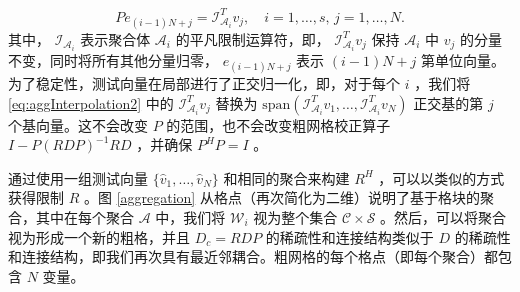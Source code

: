 \documentclass{siamltex}
\begin{document}
\begin{equation} \label{eq:aggInterpolation2}
  Pe_{(i-1)N+j} = \mathcal{I}^T_{\mathcal{A}_i}v_j, \quad i=1,\ldots,s, \, j=1,\ldots,N.
\end{equation}    其中，   $\mathcal{I}_{\mathcal{A}_i}$    表示聚合体    $\mathcal{A}_i$    的平凡限制运算符，即，   $\mathcal{I}^T_{\mathcal{A}_i}v_j$    保持    $\mathcal{A}_{i}$    中    $v_j$    的分量不变，同时将所有其他分量归零，   $e_{(i-1)N+j}$    表示    $(i-1)N+j$    第单位向量。为了稳定性，测试向量在局部进行了正交归一化，即，对于每个    $i$    ，我们将    \eqref{eq:aggInterpolation2}    中的    $\mathcal{I}_{\mathcal{A}_i}^Tv_j$    替换为    $\mbox{span}(\mathcal{I}^T_{\mathcal{A}_i}v_1,\ldots,\mathcal{I}^T_{\mathcal{A}_i}v_N)$    正交基的第    $j$    个基向量。这不会改变    $P$    的范围，也不会改变粗网格校正算子    $I-P(RDP)^{-1}RD$    ，并确保    $P^HP = I$    。

通过使用一组测试向量    $ \{  \hat{v}_1,\ldots, \hat{v}_N  \} $    和相同的聚合来构建    $R^H$    ，可以以类似的方式获得限制    $R$    。图    \ref{aggregation}    从格点（再次简化为二维）说明了基于格块的聚合，其中在每个聚合    $\mathcal{A}$    中，我们将    $\mathcal{W}_i$    视为整个集合    $\mathcal{C} \times \mathcal{S}$    。然后，可以将聚合视为形成一个新的粗格，并且    $D_c = RDP$    的稀疏性和连接结构类似于    $D$    的稀疏性和连接结构，即我们再次具有最近邻耦合。粗网格的每个格点（即每个聚合）都包含    $N$    变量。
\end{document}
